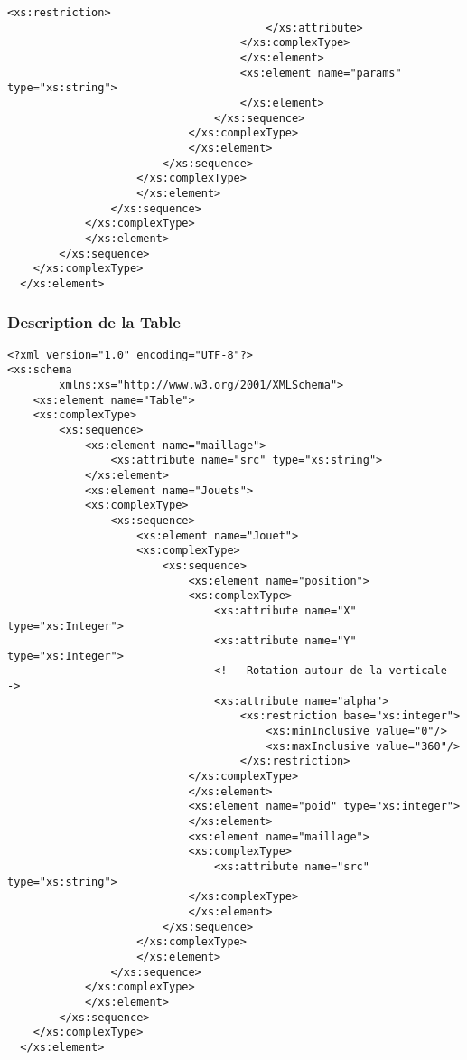 \begin{changemargin}{-1cm}{-1cm}
\begin{lstlisting}[caption=Description du Robot, label=descbot]
                                            <xs:restriction>
                                        </xs:attribute>
                                    </xs:complexType>
                                    </xs:element>
                                    <xs:element name="params" type="xs:string">
                                    </xs:element>
                                </xs:sequence>
                            </xs:complexType>
                            </xs:element>
                        </xs:sequence>
                    </xs:complexType>
                    </xs:element>
                </xs:sequence>
            </xs:complexType>
            </xs:element>
        </xs:sequence>
    </xs:complexType>
  </xs:element>
  \end{lstlisting}
\end{changemargin}
  
\clearpage
\subsubsection{Description de la Table}
 \begin{lstlisting}[caption=Description de la Table, label=desctable]
<?xml version="1.0" encoding="UTF-8"?>
<xs:schema
        xmlns:xs="http://www.w3.org/2001/XMLSchema">
    <xs:element name="Table">
    <xs:complexType>
        <xs:sequence>
            <xs:element name="maillage">
                <xs:attribute name="src" type="xs:string">
            </xs:element>
            <xs:element name="Jouets">
            <xs:complexType>
                <xs:sequence>
                    <xs:element name="Jouet">
                    <xs:complexType>
                        <xs:sequence>
                            <xs:element name="position">
                            <xs:complexType>
                                <xs:attribute name="X" type="xs:Integer">
                                <xs:attribute name="Y" type="xs:Integer">
                                <!-- Rotation autour de la verticale -->
                                <xs:attribute name="alpha">
                                    <xs:restriction base="xs:integer">
                                        <xs:minInclusive value="0"/>
                                        <xs:maxInclusive value="360"/>
                                    </xs:restriction> 
                            </xs:complexType>
                            </xs:element>
                            <xs:element name="poid" type="xs:integer">
                            </xs:element>
                            <xs:element name="maillage">
                            <xs:complexType>
                                <xs:attribute name="src" type="xs:string">
                            </xs:complexType>
                            </xs:element>
                        </xs:sequence>
                    </xs:complexType>
                    </xs:element>
                </xs:sequence>
            </xs:complexType>
            </xs:element>
        </xs:sequence>
    </xs:complexType>
  </xs:element>
  \end{lstlisting}